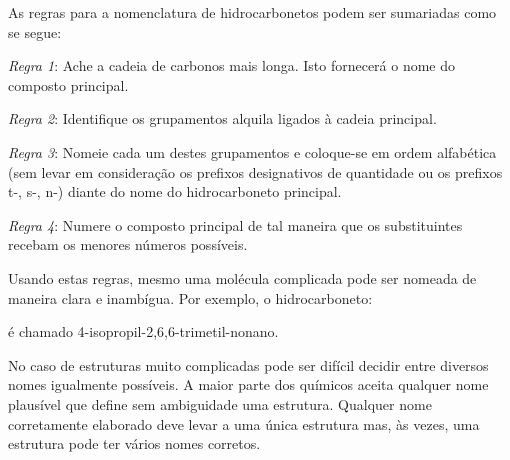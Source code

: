 \begin{tightcenter}
    \qquad\qquad
    \chemnameinit{}
\end{tightcenter}

As regras para a nomenclatura de hidrocarbonetos podem ser sumariadas como se segue:

\begin{description}
\item \textit{Regra 1}: Ache a cadeia de carbonos mais longa. Isto fornecerá o nome do composto principal.
\item \textit{Regra 2}: Identifique os grupamentos alquila ligados à cadeia principal.
\item \textit{Regra 3}: Nomeie cada um destes grupamentos e coloque-se em ordem alfabética (sem levar em consideração os prefixos designativos de quantidade ou os prefixos t-, s-, n-) diante do nome do hidrocarboneto principal.
\item \textit{Regra 4}: Numere o composto principal de tal maneira que os substituintes recebam os menores números possíveis.
\end{description}

Usando estas regras, mesmo uma molécula complicada pode ser nomeada de maneira clara e inambígua. Por exemplo, o hidrocarboneto:

\begin{tightcenter}
    \chemnameinit{}
\end{tightcenter}

\noindent é chamado 4-isopropil-2,6,6-trimetil-nonano.

No caso de estruturas muito complicadas pode ser difícil decidir entre diversos nomes igualmente possíveis. A maior parte dos químicos aceita qualquer nome plausível que define sem ambiguidade uma estrutura. Qualquer nome corretamente elaborado deve levar a uma única estrutura mas, às vezes, uma estrutura pode ter vários nomes corretos.


